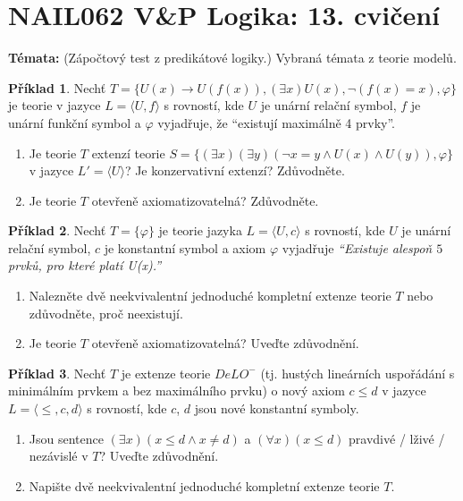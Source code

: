 \documentclass[a4paper]{article}
\theoremstyle{definition}
\newtheorem{problem}{Příklad}
\begin{document}
\section*{NAIL062 V\&P Logika: 13. cvičení}


\textbf{Témata:}
(Zápočtový test z predikátové logiky.) Vybraná témata z teorie modelů.


\medskip\begin{problem}
    Nechť $T = \{U(x) \to U(f(x)), (\exists x)U(x), \neg (f(x) = x), \varphi\}$ je teorie v jazyce $L = \langle U, f \rangle$ s rovností, kde $U$ je unární relační symbol, $f$ je unární funkční symbol a $\varphi$ vyjadřuje, že ``existují maximálně 4 prvky''.
    \begin{enumerate}
    \item Je teorie $T$ extenzí teorie $S = \{ (\exists x)(\exists y)(\neg x = y \land U(x) \land U(y)), \varphi \}$ v jazyce $L' = \langle U \rangle$? Je konzervativní extenzí? Zdůvodněte.
    \item Je teorie $T$ otevřeně axiomatizovatelná? Zdůvodněte.
    \end{enumerate} 
\end{problem}

\medskip\begin{problem}
Nechť $T=\{\varphi\}$ je teorie jazyka $L=\langle U, c \rangle$ s rovností, kde $U$ je unární relační symbol, $c$ je konstantní symbol a axiom $\varphi$ vyjadřuje \emph{``Existuje alespoň $5$ prvků, pro které platí U(x).''}
\begin{enumerate}
\item Nalezněte dvě neekvivalentní jednoduché kompletní extenze teorie $T$ nebo zdůvodněte, proč neexistují.
\item Je teorie $T$ otevřeně axiomatizovatelná? Uveďte zdůvodnění.
\end{enumerate}
\end{problem}


\medskip\begin{problem}
    Nechť $T$ je extenze teorie $DeLO^-$ (tj. hustých lineárních uspořádání s minimálním prvkem a bez maximálního prvku) o nový axiom $c \le d$ v jazyce $L=\langle \le,c,d\rangle$ s rovností, kde $c$, $d$ jsou nové konstantní symboly.
    \begin{enumerate}
    \item Jsou sentence $(\exists x)(x\le d \wedge x \ne d)$ a $(\forall x)(x \le d)$ pravdivé / lživé / nezávislé v $T$? Uveďte zdůvodnění.
    \item Napište dvě neekvivalentní jednoduché kompletní extenze teorie $T$.
    \end{enumerate} 
\end{problem}
\end{document}
